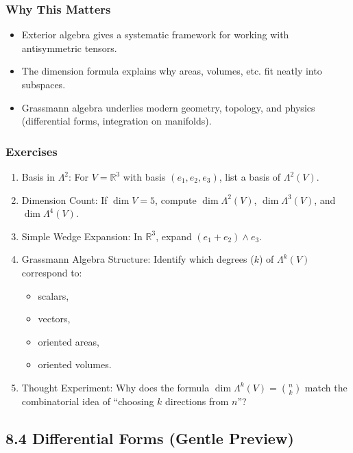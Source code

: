 \documentclass[
  letterpaper,
  DIV=11,
  numbers=noendperiod]{scrreprt}
\providecommand{\tightlist}{%
  \setlength{\itemsep}{0pt}\setlength{\parskip}{0pt}}
\begin{document}
\subsubsection{Why This Matters}\label{why-this-matters-18}

\begin{itemize}
\tightlist
\item
  Exterior algebra gives a systematic framework for working with
  antisymmetric tensors.
\item
  The dimension formula explains why areas, volumes, etc. fit neatly
  into subspaces.
\item
  Grassmann algebra underlies modern geometry, topology, and physics
  (differential forms, integration on manifolds).
\end{itemize}

\subsubsection{Exercises}\label{exercises-30}

\begin{enumerate}
\def\labelenumi{\arabic{enumi}.}
\item
  Basis in \(\Lambda^2\): For \(V = \mathbb{R}^3\) with basis
  \((e_1,e_2,e_3)\), list a basis of \(\Lambda^2(V)\).
\item
  Dimension Count: If \(\dim V = 5\), compute \(\dim \Lambda^2(V)\),
  \(\dim \Lambda^3(V)\), and \(\dim \Lambda^4(V)\).
\item
  Simple Wedge Expansion: In \(\mathbb{R}^3\), expand
  \((e_1 + e_2) \wedge e_3\).
\item
  Grassmann Algebra Structure: Identify which degrees (\(k\)) of
  \(\Lambda^k(V)\) correspond to:

  \begin{itemize}
  \tightlist
  \item
    scalars,
  \item
    vectors,
  \item
    oriented areas,
  \item
    oriented volumes.
  \end{itemize}
\item
  Thought Experiment: Why does the formula
  \(\dim \Lambda^k(V) = \binom{n}{k}\) match the combinatorial idea of
  ``choosing \(k\) directions from \(n\)''?
\end{enumerate}

\subsection{8.4 Differential Forms (Gentle
Preview)}\label{differential-forms-gentle-preview}
\end{document}
